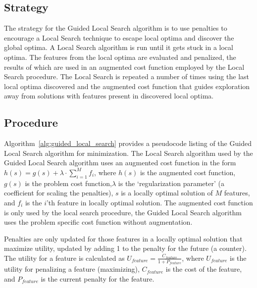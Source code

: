 \subsection{Strategy}
The strategy for the Guided Local Search algorithm is to use penalties to encourage a Local Search technique to escape local optima and discover the global optima.
A Local Search algorithm is run until it gets stuck in a local optima. The features from the local optima are evaluated and penalized, the results of which are used in an augmented cost function employed by the Local Search procedure. The Local Search is repeated a number of times using the last local optima discovered and the augmented cost function that guides exploration away from solutions with features present in  discovered local optima.

\subsection{Procedure}
Algorithm~\ref{alg:guided_local_search} provides a pseudocode listing of the Guided Local Search algorithm for minimization. 
The Local Search algorithm used by the Guided Local Search algorithm uses an augmented cost function in the form  $h(s)=g(s)+\lambda\cdot\sum_{i=1}^{M}f_i$, where 
$h(s)$ is the augmented cost function, $g(s)$ is the problem cost function,$\lambda$ is the `regularization parameter' (a coefficient for scaling the penalties), $s$ is a locally optimal solution of $M$ features, and $f_i$ is the $i$'th feature in locally optimal solution. The augmented cost function is only used by the local search procedure, the Guided Local Search algorithm uses the problem specific cost function without augmentation.

Penalties are only updated for those features in a locally optimal solution that maximize utility, updated by adding 1 to the penalty for the future (a counter). 
The utility for a feature is calculated as $U_{feature}=\frac{C_{feature}}{1+P_{feature}}$, where $U_{feature}$ is the utility for penalizing a feature (maximizing), $C_{feature}$ is the cost of the feature, and $P_{feature}$ is the current penalty for the feature.

